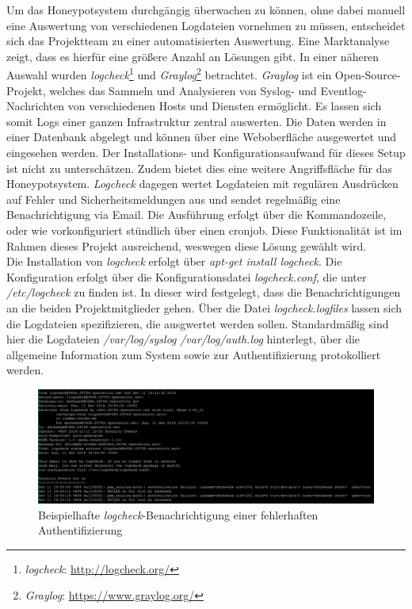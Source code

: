Um das Honeypotsystem durchgängig überwachen zu können, ohne dabei manuell eine Auswertung von verschiedenen Logdateien vornehmen zu müssen, entscheidet sich das Projektteam zu einer automatisierten Auswertung. Eine Marktanalyse zeigt, dass es hierfür eine größere Anzahl an Lösungen gibt. In einer näheren Auswahl wurden \textit{logcheck}\footnote{ \textit{logcheck}: \url{http://logcheck.org/}} und \textit{Graylog}\footnote{ \textit{Graylog}: \url{https://www.graylog.org/}} betrachtet. \textit{Graylog} ist ein Open-Source-Projekt, welches das Sammeln und Analysieren von Syslog- und Eventlog-Nachrichten von verschiedenen Hosts und Diensten ermöglicht. Es lassen sich somit Logs einer ganzen Infrastruktur zentral auswerten. Die Daten werden in einer Datenbank abgelegt und können über eine Weboberfläche ausgewertet und eingesehen werden. Der Installations- und Konfigurationsaufwand für dieses Setup ist nicht zu unterschätzen. Zudem bietet dies eine weitere Angriffsfläche für das Honeypotsystem. \textit{Logcheck} dagegen wertet Logdateien mit regulären Ausdrücken auf Fehler und Sicherheitsmeldungen aus und sendet regelmäßig eine Benachrichtigung via Email. Die Ausführung erfolgt über die Kommandozeile, oder wie vorkonfiguriert stündlich über einen cronjob. Diese Funktionalität ist im Rahmen dieses Projekt ausreichend, weswegen diese Lösung gewählt wird.\\

Die Installation von \textit{logcheck} erfolgt über \textit{apt-get install logcheck}. Die Konfiguration erfolgt über die Konfigurationsdatei \textit{logcheck.conf}, die unter \textit{/etc/logcheck} zu finden ist. In dieser wird festgelegt, dass die Benachrichtigungen an die beiden Projektmitglieder gehen. Über die Datei \textit{logcheck.logfiles} lassen sich die Logdateien spezifizieren, die ausgwertet werden sollen. Standardmäßig sind hier die Logdateien \textit{/var/log/syslog} \textit{/var/log/auth.log} hinterlegt, über die allgemeine Information zum System sowie zur Authentifizierung protokolliert werden.

\begin{figure}[ht]
	\centering
		\includegraphics[width=1.0\textwidth]{img/logcheck_benachrichtigung.png}
	\caption{Beispielhafte \textit{logcheck}-Benachrichtigung einer fehlerhaften Authentifizierung}
	\label{fig:logcheck}
\end{figure}



